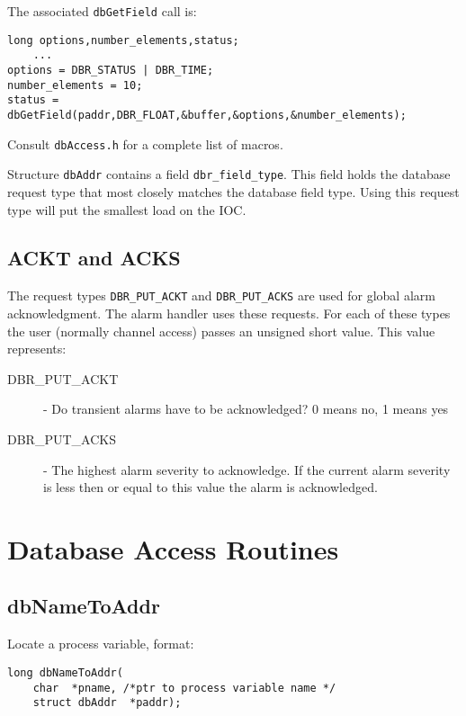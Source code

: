 The associated \verb|dbGetField| call is:

\begin{verbatim}
long options,number_elements,status;
    ...
options = DBR_STATUS | DBR_TIME;
number_elements = 10;
status = dbGetField(paddr,DBR_FLOAT,&buffer,&options,&number_elements);
\end{verbatim}

Consult \verb|dbAccess.h| for a complete list of macros.

Structure \verb|dbAddr| contains a field \verb|dbr_field_type|.
This field holds the database request type that most closely matches the database field type.
Using this request type will put the smallest load on the IOC.

\subsection{ACKT and ACKS}

The request types \verb|DBR_PUT_ACKT| and \verb|DBR_PUT_ACKS| are used for global alarm acknowledgment.
The alarm handler uses these requests.
For each of these types the user (normally channel access) passes an unsigned short value.
This value represents:

\begin{description}

\item[DBR\_PUT\_ACKT]  - Do transient alarms have to be acknowledged? 0 means no, 1 means yes

\item[DBR\_PUT\_ACKS] - The highest alarm severity to acknowledge.
If the current alarm severity is less then or equal to this value the alarm is acknowledged.

\end{description}

\section{Database Access Routines}

\subsection{dbNameToAddr}

Locate a process variable, format:

\begin{verbatim}
long dbNameToAddr(
    char  *pname, /*ptr to process variable name */
    struct dbAddr  *paddr);
\end{verbatim}

